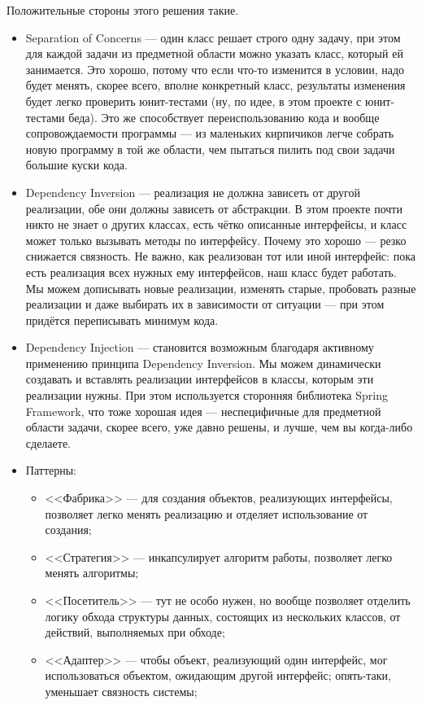 \documentclass{../../text-style}
\begin{document}
Положительные стороны этого решения такие.
\begin{itemize}
    \item Separation of Concerns --- один класс решает строго одну задачу, при этом для каждой задачи из предметной области можно указать класс, который ей занимается. Это хорошо, потому что если что-то изменится в условии, надо будет менять, скорее всего, вполне конкретный класс, результаты изменения будет легко проверить юнит-тестами (ну, по идее, в этом проекте с юнит-тестами беда). Это же способствует переиспользованию кода и вообще сопровождаемости программы --- из маленьких кирпичиков легче собрать новую программу в той же области, чем пытаться пилить под свои задачи большие куски кода.
    \item Dependency Inversion --- реализация не должна зависеть от другой реализации, обе они должны зависеть от абстракции. В этом проекте почти никто не знает о других классах, есть чётко описанные интерфейсы, и класс может только вызывать методы по интерфейсу. Почему это хорошо --- резко снижается связность. Не важно, как реализован тот или иной интерфейс: пока есть реализация всех нужных ему интерфейсов, наш класс будет работать. Мы можем дописывать новые реализации, изменять старые, пробовать разные реализации и даже выбирать их в зависимости от ситуации --- при этом придётся переписывать минимум кода.
    \item Dependency Injection --- становится возможным благодаря активному применению принципа Dependency Inversion. Мы можем динамически создавать и вставлять реализации интерфейсов в классы, которым эти реализации нужны. При этом используется сторонняя библиотека Spring Framework, что тоже хорошая идея --- неспецифичные для предметной области задачи, скорее всего, уже давно решены, и лучше, чем вы когда-либо сделаете.
    \item Паттерны:
    \begin{itemize}
        \item <<Фабрика>> --- для создания объектов, реализующих интерфейсы, позволяет легко менять реализацию и отделяет использование от создания;
        \item <<Стратегия>> --- инкапсулирует алгоритм работы, позволяет легко менять алгоритмы;
        \item <<Посетитель>> --- тут не особо нужен, но вообще позволяет отделить логику обхода структуры данных, состоящих из нескольких классов, от действий, выполняемых при обходе; 
        \item <<Адаптер>> --- чтобы объект, реализующий один интерфейс, мог использоваться объектом, ожидающим другой интерфейс; опять-таки, уменьшает связность системы;

\end{itemize}
\end{itemize}
\end{document}
